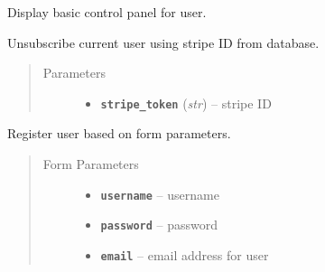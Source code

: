 \documentclass[letterpaper,10pt,english]{sphinxmanual}
\begin{document}
\begin{fulllineitems}
\label{users:post--user-control-panel}
Display basic control panel for user.

\end{fulllineitems}



\begin{fulllineitems}
\label{users:get--user-unsubscribe}
Unsubscribe current user using stripe ID from database.
\begin{quote}\begin{description}
\item[{Parameters}] \leavevmode\begin{itemize}
\item {} 
\textbf{\texttt{stripe\_token}} (\emph{str}) -- stripe ID

\end{itemize}

\end{description}\end{quote}

\end{fulllineitems}



\begin{fulllineitems}
\label{users:get--user-register}
Register user based on form parameters.
\begin{quote}\begin{description}
\item[{Form Parameters}] \leavevmode\begin{itemize}
\item {} 
\textbf{\texttt{username}} -- username

\item {} 
\textbf{\texttt{password}} -- password

\item {} 
\textbf{\texttt{email}} -- email address for user

\end{itemize}

\end{description}\end{quote}

\end{fulllineitems}
\end{document}
